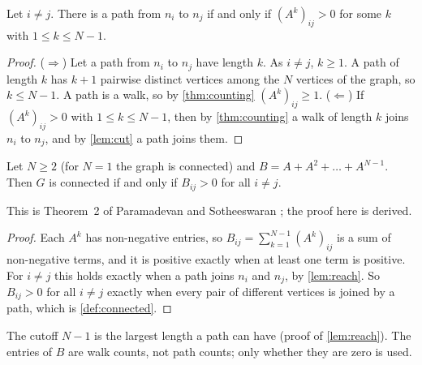 \begin{lemma}\label{lem:reach}
Let $i\ne j$. There is a path from $n_i$ to $n_j$ if and only if
$(A^k)_{ij}>0$ for some $k$ with $1\le k\le N-1$.
\end{lemma}
\begin{proof}
($\Rightarrow$) Let a path from $n_i$ to $n_j$ have length $k$. As $i\ne j$,
$k\ge 1$. A path of length $k$ has $k+1$ pairwise distinct vertices among
the $N$ vertices of the graph, so $k\le N-1$. A path is a walk, so by
\cref{thm:counting} $(A^k)_{ij}\ge 1$. ($\Leftarrow$) If $(A^k)_{ij}>0$ with
$1\le k\le N-1$, then by \cref{thm:counting} a walk of length $k$ joins $n_i$
to $n_j$, and by \cref{lem:cut} a path joins them.
\end{proof}

\begin{theorem}\label{thm:sum}
Let $N\ge 2$ (for $N=1$ the graph is connected) and $B=A+A^2+\dots+A^{N-1}$. Then $G$ is connected if and only if
$B_{ij}>0$ for all $i\ne j$.
\end{theorem}
This is Theorem~2 of Paramadevan and Sotheeswaran
\cite[p.~17]{paramadevan2021adjacency}; the proof here is derived.
\begin{proof}
Each $A^k$ has non-negative entries, so $B_{ij}=\sum_{k=1}^{N-1}(A^k)_{ij}$ is a
sum of non-negative terms, and it is positive exactly when at least one term
is positive. For $i\ne j$ this holds exactly when a path joins $n_i$ and
$n_j$, by \cref{lem:reach}. So $B_{ij}>0$ for all $i\ne j$ exactly when every
pair of different vertices is joined by a path, which is
\cref{def:connected}.
\end{proof}
The cutoff $N-1$ is the largest length a path can have
(proof of \cref{lem:reach}). The entries of $B$ are walk counts, not path counts; only
whether they are zero is used.
